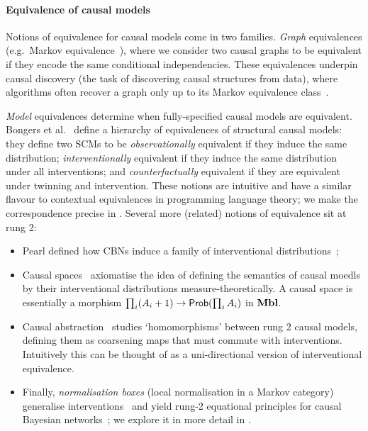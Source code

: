 \documentclass[11pt,a4paper]{article}
\begin{document}
\paragraph{Equivalence of causal models}\label{par:equiv} Notions of equivalence for causal models come in two families. \emph{Graph} equivalences (e.g.\ Markov equivalence~\cite{verma1990equivalence,pearl2009causality}), where we consider two causal graphs to be equivalent if they encode the same conditional independencies. These equivalences underpin causal discovery (the task of discovering causal structures from data), where algorithms often recover a graph only up to its Markov equivalence class~\cite{spirtes2000causation,peters_janzing_schoelkopf_2017_book}. 

\emph{Model} equivalences determine when fully-specified causal models are equivalent. Bongers et al.~\cite{Bongers_2021} define a hierarchy of equivalences of structural causal models: they define two SCMs to be \emph{observationally} equivalent if they induce the same distribution; \emph{interventionally} equivalent if they induce the same distribution under all interventions; and \emph{counterfactually} equivalent if they are equivalent under twinning and intervention. These notions are intuitive and have a similar flavour to contextual equivalences in programming language theory; we make the correspondence precise in . 
Several more (related) notions of equivalence sit at rung 2:
\begin{itemize}
    \item Pearl defined how CBNs induce a family of interventional distributions~\cite{pearl2009causality};
    \item Causal spaces~\cite{park2024measuretheoreticaxiomatisationcausality,buchholz2024products} axiomatise the idea of defining the semantics of causal moedls by their interventional distributions measure-theoretically. A causal space is essentially a morphism $\prod_i(A_i+1)\to\mathsf{Prob}(\prod_i A_i)$ in $\mathbf{Mbl}$.
    \item Causal abstraction~\cite{rubenstein2017consistency,beckers2019abstracting,lorenztull2026abstraction} studies `homomorphisms' between rung 2 causal models, defining them as coarsening maps that must commute with interventions. Intuitively this can be thought of as a uni-directional version of interventional equivalence. 
    \item Finally, \emph{normalisation boxes} (local normalisation in a Markov category) generalise interventions~\cite{lorenz2023causalmodelsstringdiagrams, jacobsszelesstein2025inference} and yield rung-2 equational principles for causal Bayesian networks~\cite{jacobsszelesstein2025inference,agrawal2026equational}; we explore it in more detail in . 
\end{itemize}
\end{document}
